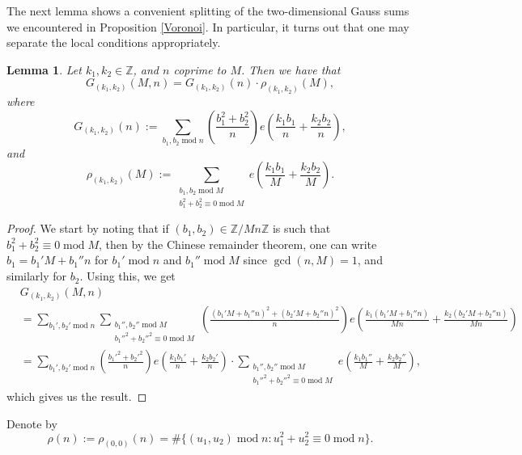 \documentclass[12pt]{amsart}
\def\Z{\mathbb{Z}}
\newtheorem{lemma}[theorem]{Lemma}
\def\Z{\mathbb Z}
\def\Z{\mathbb Z}
\def\mod{\operatorname{mod}}
\def\gcd{\operatorname{gcd}}
\begin{document}
The next lemma shows a convenient splitting of the two-dimensional Gauss sums we encountered in Proposition \ref{Voronoi}. In particular, it turns out that one may separate the local conditions appropriately.
\begin{lemma}\label{splitting_G}
Let $k_1,k_2\in \Z$, and $n$ coprime to $M$. Then we have that
$$ G_{(k_1,k_2)}(M,n)= G_{(k_1,k_2)}(n) \cdot \rho_{(k_1,k_2)}(M) ,$$
where 
$$ G_{(k_1,k_2)}(n) := \sum_{b_1,b_2\mod n} \left(\frac{b_1^2+b_2^2}{n}\right) e\left( \frac{k_1b_1}{n} + \frac{k_2 b_2}{n} \right) , $$
and
$$\rho_{(k_1,k_2)}(M) := \sum_{\substack{b_1,b_2 \mod M \\ b_1^2+b_2^2\equiv 0 \mod M}} e \left( \frac{k_1b_1}{M} + \frac{k_2 b_2}{M} \right). $$
\end{lemma}
\begin{proof}
    We start by noting that if $(b_1,b_2)\in \Z/Mn\Z$ is such that $b_1^2+b_2^2 \equiv 0 \mod M$, then by the Chinese remainder theorem, one can write $b_1=b_1'M+b_1''n$ for $b_1' \mod n$ and $b_1'' \mod M$ since $\gcd(n,M)=1$, and similarly for $b_2$. Using this, we get
    \begin{align*}
        &G_{(k_1,k_2)}(M,n) \\
        &= \sum_{b_1',b_2' \mod n} \sum_{\substack{b_1'',b_2'' \mod M \\ b_1''^2+b_2''^2 \equiv 0 \mod M}} \left( \frac{(b_1'M+ b_1''n)^2 + (b_2'M+b_2''n)^2}{n} \right) e\left( \frac{k_1(b_1'M+b_1''n)}{Mn} + \frac{k_2(b_2'M+b_2''n)}{Mn} \right) \\
        &=\sum_{b_1',b_2' \mod n} \left( \frac{b_1'^2+b_2'^2}{n} \right) e\left( \frac{k_1 b_1'}{n} + \frac{k_2 b_2'}{n}\right) \cdot \sum_{\substack{b_1'',b_2'' \mod M \\ b_1''^2+b_2''^2 \equiv 0 \mod M}} e\left( \frac{k_1 b_1''}{M} + \frac{k_2 b_2''}{M}\right),
    \end{align*}
    which gives us the result.
\end{proof}

Denote by 
\begin{equation}\label{def_of_rho}
\rho(n):=\rho_{(0,0)}(n)=\#\{ (u_1,u_2)\mod n : u_1^2+u_2^2\equiv 0 \mod n \}.    
\end{equation}
\end{document}
